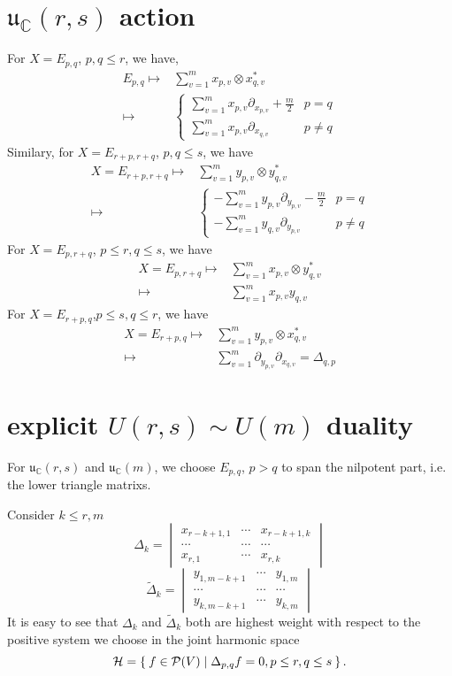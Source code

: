 \documentclass[12pt]{article}
\def\bC{{\mathbb{C}}}
\def\sP{\mathcal{P}}
\def\sH{\mathcal{H}}
\def\tDelta{\widetilde{\Delta}}
\def\fuu{\mathfrak{u}}
\begin{document}
\section{$\fuu_\bC(r,s)$ action}
For $X=E_{p,q}$, $p,q \leq r$, we have, 
\[
\begin{split}
E_{p,q} \mapsto& \sum_{v=1}^mx_{p,v}\otimes x_{q,v}^*\\
\mapsto& 
\begin{cases}
\sum_{v=1}^m x_{p,v} \partial_{x_{p,v}} + \frac{m}{2} & p=q\\
\sum_{v=1}^m x_{p,v} \partial_{x_{q,v}} & p\neq q
\end{cases}
\end{split}
\]
Similary, for $X=E_{r+p,r+q}$, $p,q\leq s$, we have
\[
\begin{split}
X=E_{r+p,r+q} \mapsto& \sum_{v=1}^{m} y_{p,v}\otimes y_{q,v}^* \\
\mapsto &
\begin{cases}
-\sum_{v=1}^m y_{p,v}\partial_{y_{p,v}} - \frac{m}{2} & p=q\\
-\sum_{v=1}^m y_{q,v}\partial_{y_{p,v}} & p\neq q
\end{cases}
\end{split}
\]
For $X= E_{p,r+q}$, $p\leq r,q\leq s$, we have
\[
\begin{split}
X = E_{p,r+q} \mapsto& \sum_{v=1}^m x_{p,v}\otimes y_{q,v}^*\\
\mapsto& \sum_{v=1}^m x_{p,v}y_{q,v}
\end{split}
\]
For $X=E_{r+p,q}$,$p\leq s, q\leq r$, we have
\[
\begin{split}
X = E_{r+p,q} \mapsto& \sum_{v=1}^m y_{p,v}\otimes x_{q,v}^*\\
\mapsto& \sum_{v=1}^m \partial_{y_{p,v}}\partial_{x_{q,v}}=\Delta_{q,p}
\end{split}
\]

\section{explicit $U(r,s) \sim U(m)$ duality}
For $\fuu_\bC(r,s)$ and $\fuu_\bC(m)$,
 we choose $E_{p,q}$, $p>q$ to span the nilpotent part,
i.e. the lower triangle matrixs. 

Consider $k \leq r, m$
\[
\Delta_{k} = \begin{vmatrix}
  x_{r-k+1,1}& \cdots& x_{r-k+1,k}\\
  \cdots & \cdots & \cdots \\
  x_{r,1} & \cdots & x_{r,k}
\end{vmatrix}
\]
\[
\tDelta_{k} = \begin{vmatrix}
  y_{1,m-k+1}& \cdots& y_{1,m}\\
  \cdots & \cdots & \cdots \\
  y_{k,m-k+1} & \cdots & y_{k,m}
\end{vmatrix}
\]
It is easy to see that $\Delta_k$ and $\tDelta_k$ both are 
highest weight with respect to the positive system we choose
in the joint harmonic space
\[
\sH = \Set{f\in \sP(V)|\Delta_{p,q}f = 0 , p\leq r, q\leq s}. 
\]
\end{document}
